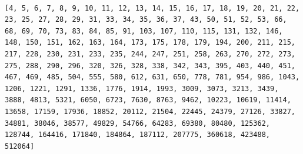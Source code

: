 \begin{verbatim}

[4, 5, 6, 7, 8, 9, 10, 11, 12, 13, 14, 15, 16, 17, 18, 19, 20, 21, 22, 23, 25, 27, 28, 29, 31, 33, 34, 35, 36, 37, 43, 50, 51, 52, 53, 66, 68, 69, 70, 73, 83, 84, 85, 91, 103, 107, 110, 115, 131, 132, 146, 148, 150, 151, 162, 163, 164, 173, 175, 178, 179, 194, 200, 211, 215, 217, 228, 230, 231, 233, 235, 244, 247, 251, 258, 263, 270, 272, 273, 275, 288, 290, 296, 320, 326, 328, 338, 342, 343, 395, 403, 440, 451, 467, 469, 485, 504, 555, 580, 612, 631, 650, 778, 781, 954, 986, 1043, 1206, 1221, 1291, 1336, 1776, 1914, 1993, 3009, 3073, 3213, 3439, 3888, 4813, 5321, 6050, 6723, 7630, 8763, 9462, 10223, 10619, 11414, 13658, 17159, 17936, 18852, 20112, 21504, 22445, 24379, 27126, 33827, 34881, 38046, 38577, 49829, 54766, 64283, 69380, 80480, 125362, 128744, 164416, 171840, 184864, 187112, 207775, 360618, 423488, 512064]

\end{verbatim}

